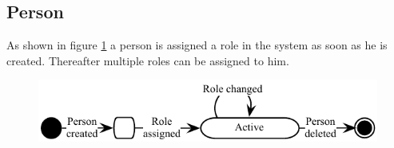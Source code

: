 \subsection{Person}
As shown in figure \ref{fig:Klasse_diagram_person} a person is assigned a role in the system as soon as he is created. Thereafter multiple roles can be assigned to him.
\begin{figure}[H]
\begin{center}
\includegraphics[scale=1]{input/problem_domain_analysis/Klassediagram_person.pdf}
\label{fig:Klasse_diagram_person}
\end{center}
\end{figure}

